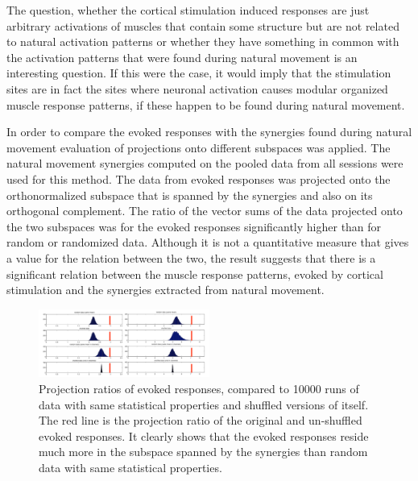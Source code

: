 
The question, whether the cortical stimulation induced responses are just arbitrary activations of muscles that contain some structure but are not related to natural activation patterns or whether they have something in common with the activation patterns that were found during natural movement is an interesting question. If this were the case, it would imply that the stimulation sites are in fact the sites where neuronal activation causes modular organized muscle response patterns, if these happen to be found during natural movement. 

In order to compare the evoked responses with the synergies found during natural movement evaluation of projections onto different subspaces was applied. The natural movement synergies computed on the pooled data from all sessions were used for this method. The data from evoked responses was projected onto the orthonormalized subspace that is spanned by the synergies and also on its orthogonal complement. The ratio of the vector sums of the data projected onto the two subspaces was for the evoked responses significantly higher than for random or randomized data. Although it is not a quantitative measure that gives a value for the relation between the two, the result suggests that there is a significant relation between the muscle response patterns, evoked by cortical stimulation and the synergies extracted from natural movement. 
\begin{figure}[ht]
	\centering
		\includegraphics[width=0.5\textwidth]{images/projections.pdf}
	\caption{Projection ratios of evoked responses, compared to 10000 runs of data with same statistical properties and shuffled versions of itself. The red line is the projection ratio of the original and un-shuffled evoked responses. It clearly shows that the evoked responses reside much more in the subspace spanned by the synergies than random data with same statistical properties.}
	\label{sg:fig:images_projection}
\end{figure}








